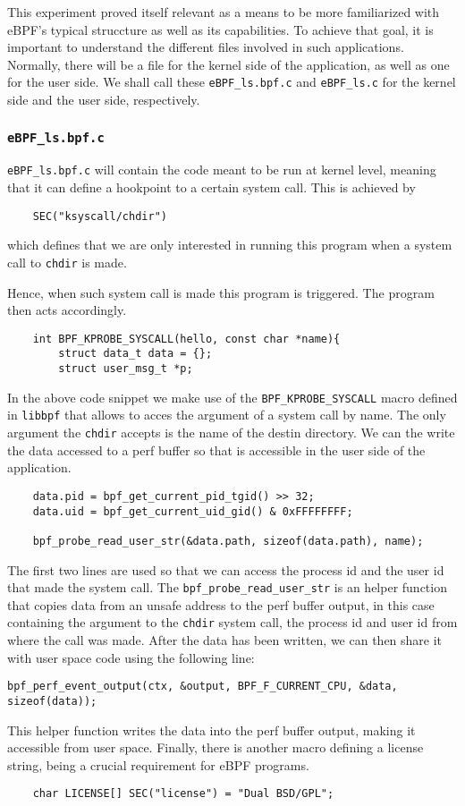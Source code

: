 This experiment proved itself relevant as a means to be more familiarized with eBPF's typical struccture as well as its capabilities.
To achieve that goal, it is important to understand the different files involved in such applications. Normally, there will be a file for the kernel side of the application, as well as one for the user side. We shall call these \texttt{eBPF\_ls.bpf.c} and \texttt{eBPF\_ls.c} for the kernel side and the user side, respectively.

\subsubsection{\texttt{eBPF\_ls.bpf.c}}
\texttt{eBPF\_ls.bpf.c} will contain the code meant to be run at kernel level, meaning that it can define a hookpoint to a certain system call. This is achieved by


\begin{lstlisting}
    SEC("ksyscall/chdir")
\end{lstlisting}
which defines that we are only interested in running this program when a system call to \texttt{chdir} is made.

Hence, when such system call is made this program is triggered. The program then acts accordingly.

\begin{lstlisting}
    int BPF_KPROBE_SYSCALL(hello, const char *name){
        struct data_t data = {};
        struct user_msg_t *p; 
\end{lstlisting}
In the above code snippet we make use of the \texttt{BPF\_KPROBE\_SYSCALL} macro defined in \texttt{libbpf} that allows to acces the argument of a system call by name. The only argument the \texttt{chdir} accepts is the name of the destin directory. We can the write the data accessed to a perf buffer so that is accessible in the user side of the application.

\begin{lstlisting}
    data.pid = bpf_get_current_pid_tgid() >> 32;
    data.uid = bpf_get_current_uid_gid() & 0xFFFFFFFF;

    bpf_probe_read_user_str(&data.path, sizeof(data.path), name);
\end{lstlisting}
The first two lines are used so that we can access the process id and the user id that made the system call.
The \texttt{bpf\_probe\_read\_user\_str} is an helper function that copies data from an unsafe address to the perf buffer output, in this case containing the argument to the \texttt{chdir} system call, the process id and user id from where the call was made.
After the data has been written, we can then share it with user space code using the following line:
\begin{lstlisting}
bpf_perf_event_output(ctx, &output, BPF_F_CURRENT_CPU, &data, sizeof(data));
\end{lstlisting}
This helper function writes the data into the perf buffer output, making it accessible from user space.
Finally, there is another macro defining a license string, being a crucial requirement for eBPF programs.
\begin{lstlisting}
    char LICENSE[] SEC("license") = "Dual BSD/GPL";
\end{lstlisting}

